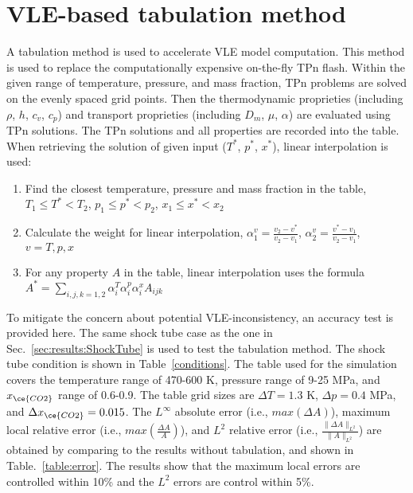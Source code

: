  \section{VLE-based tabulation method} \label{App:tab} %
    
    A tabulation method is used to accelerate VLE model computation. This method is used to replace the computationally expensive on-the-fly TPn flash. Within the given range of temperature, pressure, and mass fraction, TPn problems are solved on the evenly spaced grid points. Then the thermodynamic proprieties (including $\rho$, $h$, $c_v$, $c_p$) and  transport  proprieties (including $D_m$, $\mu$, $\alpha$) are evaluated using TPn solutions. 
    The TPn solutions and all properties are recorded into the table. When retrieving the solution of given input ($T^*$, $p^*$, $x^*$), linear interpolation is used:
    \begin{enumerate}
     \item Find the closest temperature, pressure and mass fraction in the table, 
     $T_1 \leq T^* < T_2 $,
     $p_1 \leq p^* < p_2 $,
     $x_1 \leq x^* < x_2 $
     \item Calculate the weight for linear interpolation,
     $ \alpha^v_1=\frac{v_2-v^*}{v_2-v_1}$,
     $ \alpha^v_2=\frac{v^*-v_1}{v_2-v_1}$, $v=T,p,x$
     \item For any property $A$ in the table, linear interpolation uses the formula $A^* = \sum_{i,j,k=1,2}\alpha^T_i \alpha^p_i \alpha^x_i A_{ijk} $
    \end{enumerate}
    
    To mitigate the concern about potential VLE-inconsistency, an accuracy test is provided here. The same shock tube case as the one in Sec.~\ref{sec:results:ShockTube} is used to test the tabulation method. The shock tube condition is shown in Table~\ref{conditions}.
    The table used for the simulation covers the temperature range of 470-600 K, pressure range of 9-25 MPa, and $x_{\ce{CO2}}$ range of 0.6-0.9. The table grid sizes are $\Delta T = 1.3$ K, $\Delta p = 0.4$ MPa, and $\Delta x_{\ce{CO2}} = 0.015$.
    The $L^{\infty}$ absolute error (i.e., $max(\Delta A)$), maximum local relative error (i.e., $max(\frac{\Delta A}{A})$), and $L^2$ relative error (i.e., $ \frac{\|\Delta A\|_{L^2}}{\|A\|_{L^2}}$) are obtained by comparing to the results without tabulation, and shown in Table.~\ref{table:error}. The results show that the maximum local errors are controlled within 10\% and the $L^2$ errors are control within 5\%.

